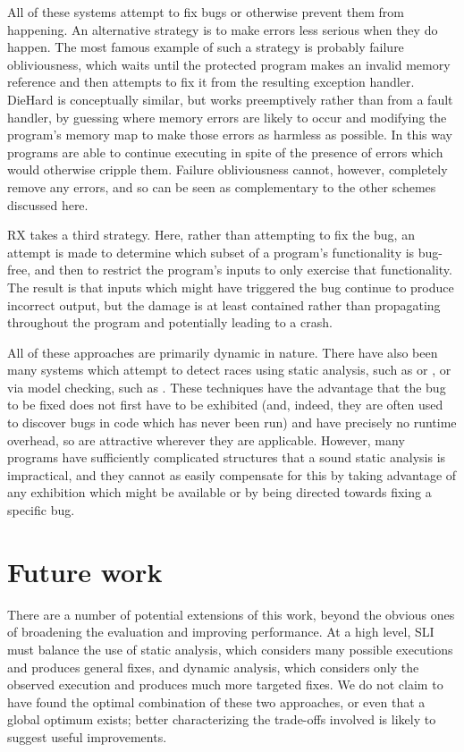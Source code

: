 \documentclass[10pt,letter,twocolumn]{sigplanconf}
\begin{document}
All of these systems attempt to fix bugs or otherwise prevent them
from happening.  An alternative strategy is to make errors less
serious when they do happen.  The most famous example of such a
strategy is probably failure obliviousness\cite{Rinard2004}, which
waits until the protected program makes an invalid memory reference
and then attempts to fix it from the resulting exception handler.
DieHard\cite{Berger2006} is conceptually similar, but works
preemptively rather than from a fault handler, by guessing where
memory errors are likely to occur and modifying the program's memory
map to make those errors as harmless as possible.  In this way
programs are able to continue executing in spite of the presence of
errors which would otherwise cripple them.  Failure obliviousness
cannot, however, completely remove any errors, and so can be seen as
complementary to the other schemes discussed here.

RX\cite{Qin2007} takes a third strategy.  Here, rather than
attempting to fix the bug, an attempt is made to determine which
subset of a program's functionality is bug-free, and then to restrict
the program's inputs to only exercise that functionality.  The result
is that inputs which might have triggered the bug continue to produce
incorrect output, but the damage is at least contained rather than
propagating throughout the program and potentially leading to a crash.

All of these approaches are primarily dynamic in nature.  There have
also been many systems which attempt to detect races using static
analysis, such as \cite{Pratikakis2006} or \cite{Engler2003}, or via
model checking, such as \cite{Elmas06preciserace}.  These techniques
have the advantage that the bug to be fixed does not first have to be
exhibited (and, indeed, they are often used to discover bugs in code
which has never been run) and have precisely no runtime overhead, so
are attractive wherever they are applicable.  However, many programs
have sufficiently complicated structures that a sound static analysis
is impractical, and they cannot as easily compensate for this by
taking advantage of any exhibition which might be available or by
being directed towards fixing a specific bug.

\section{Future work}

There are a number of potential extensions of this work, beyond the
obvious ones of broadening the evaluation and improving performance.
At a high level, SLI must balance the use of static analysis, which
considers many possible executions and produces general fixes, and
dynamic analysis, which considers only the observed execution and
produces much more targeted fixes.  We do not claim to have found the
optimal combination of these two approaches, or even that a global
optimum exists; better characterizing the trade-offs involved is
likely to suggest useful improvements.
\end{document}
